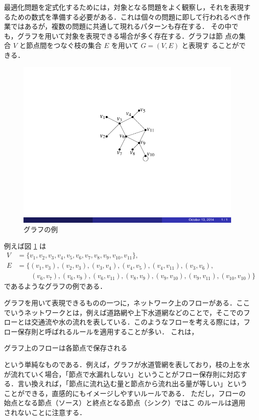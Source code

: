 \documentclass[a4paper,12pt,fleqn]{jarticle}
\begin{document}
最適化問題を定式化するためには，対象となる問題をよく観察し，それを表現す
るための数式を準備する必要がある．これは個々の問題に即して行われるべき作
業ではあるが，複数の問題に共通して現れるパターンも存在する．
%
その中でも，グラフを用いて対象を表現できる場合が多く存在する．グラフは節
点の集合 $V$ と節点間をつなぐ枝の集合 $E$ を用いて $G = (V, E)$ と表現す
ることができる．
%
\begin{figure}[htpb]
 \begin{center}
  \includegraphics[scale=1.5, bb = 100 100 260 230, clip]{./fig/fig_GraphEx.pdf}
  \caption{グラフの例}
  \label{fig:Graph1}
 \end{center}
\end{figure}
%
例えば図 \ref{fig:Graph1} は
%
\begin{align*}
 V &= \{v_1, v_2, v_3, v_4, v_5, v_6, v_7, v_8, v_9, v_{10}, v_{11}\}, \\
 E &= \{ (v_1, v_3),(v_2, v_3),(v_3, v_4),(v_4, v_5),(v_4, v_{11}),(v_3, v_6), \\
 & \quad \quad (v_6, v_7),(v_6, v_9),(v_6, v_{11}),(v_8, v_9),(v_9, v_{10}),(v_9, v_{11}),
 (v_{10}, v_{10}) \}
\end{align*}
%
であるようなグラフの例である．

グラフを用いて表現できるものの一つに，ネットワーク上のフローがある．ここ
でいうネットワークとは，例えば道路網や上下水道網などのことで，そこでのフ
ローとは交通流や水の流れを表している．このようなフローを考える際には，フ
ロー保存則と呼ばれるルールを適用することが多い．
%
これは，
%
\begin{screen}
 グラフ上のフローは各節点で保存される
\end{screen}
%
という単純なものである．例えば，グラフが水道管網を表しており，枝の上を水
が流れていく場合，「節点で水漏れしない」ということがフロー保存則に対応す
る．言い換えれば，「節点に流れ込む量と節点から流れ出る量が等しい」という
ことができる，直感的にもイメージしやすいルールである．
%
ただし，フローの始点となる節点（ソース）と終点となる節点（シンク）ではこ
のルールは適用されないことに注意する．
\end{document}
